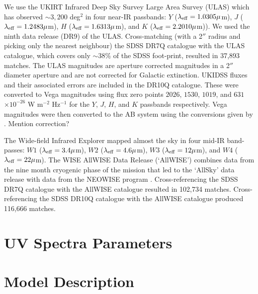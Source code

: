 We use the UKIRT Infrared Deep Sky Survey \citep[UKIDSS;][]{lawrence07} Large Area Survey (ULAS) which has observed $\sim 3,200$ deg$^2$ in four near-IR passbands: $Y$ ($\lambda_{\rm eff} = 1.0305\mu$m), $J$ ($\lambda_{\rm eff} = 1.2483\mu$m), $H$ ($\lambda_{\rm eff} = 1.6313\mu$m), and $K$ ($\lambda_{\rm eff} = 2.2010\mu$m)). We used the ninth data release (DR9) of the ULAS. Cross-matching (with a 2$''$ radius and picking only the nearest neighbour) the SDSS DR7Q catalogue with the ULAS catalogue, which covers only $\sim 38$\% of the SDSS foot-print, resulted in 37,893 matches. The ULAS magnitudes are aperture corrected magnitudes in a 2$''$ diameter aperture and are not corrected for Galactic extinction. UKIDSS fluxes and their associated errors are included in the DR10Q catalogue. These were converted to Vega magnitudes using flux zero points $2026$, $1530$, $1019$, and $631$ $\times10^{-26}$ W m$^{-2}$ Hz$^{-1}$ for the $Y$, $J$, $H$, and $K$ passbands respectively. Vega magnitudes were then converted to the AB system using the conversions given by \citet{hewett06}. Mention correction? 

The Wide-field Infrared Explorer \citep[WISE;][]{wright10} mapped almost the sky in four mid-IR band-passes: $W1$ ($\lambda_{\rm eff} = 3.4\mu$m), $W2$ ($\lambda_{\rm eff} = 4.6\mu$m), $W3$ ($\lambda_{\rm eff} = 12\mu$m), and $W4$ ($\lambda_{\rm eff} = 22\mu$m). The WISE AllWISE Data Release (`AllWISE') combines data from the nine month cryogenic phase of the mission that led to the `AllSky' data release with data from the NEOWISE program \citep{mainzer11}. Cross-referencing the SDSS DR7Q catalogue with the AllWISE catalogue resulted in 102,734 matches. Cross-referencing the SDSS DR10Q catalogue with the AllWISE catalogue produced 116,666 matches. 

\section{UV Spectra Parameters}

\section{Model Description}

